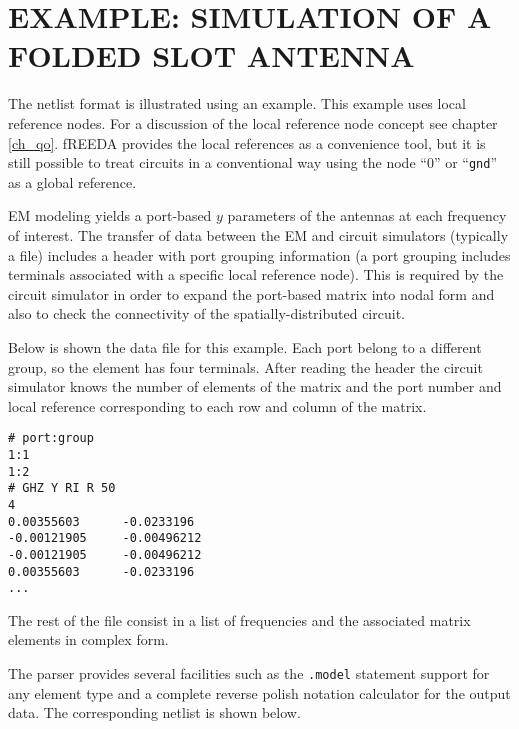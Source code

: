 \section[Example: simulation of a folded slot antenna]{EXAMPLE: SIMULATION OF A FOLDED SLOT ANTENNA}

The netlist format is illustrated using an example. This example uses
local reference nodes. For a discussion of the local reference node
concept see chapter \ref{ch_qo}. fREEDA provides the local
references as a convenience tool, but it is still possible to treat
circuits in a conventional way using the node ``0'' or ``{\tt gnd}''
as a global reference.

EM modeling yields a port-based $y$ parameters of the antennas at each
frequency of interest. The transfer of data between the EM and circuit
simulators (typically a file) includes a header with port grouping
information (a port grouping includes terminals associated with a
specific local reference node). This is required by the circuit
simulator in order to expand the port-based matrix into nodal form and
also to check the connectivity of the spatially-distributed circuit.

Below is shown the data file for this example. Each port belong to a
different group, so the element has four terminals. After reading the
header the circuit simulator knows the number of elements of the
matrix and the port number and local reference corresponding to each
row and column of the matrix.

\begin{verbatim}
# port:group
1:1
1:2
# GHZ Y RI R 50
4
0.00355603      -0.0233196
-0.00121905     -0.00496212
-0.00121905     -0.00496212
0.00355603      -0.0233196
...
\end{verbatim}

The rest of the file consist in a list of frequencies and the
associated matrix elements in complex form.

The parser provides several facilities such as the {\tt .model}
statement support for any element type and a complete reverse polish
notation calculator for the output data. The corresponding netlist is
shown below.

